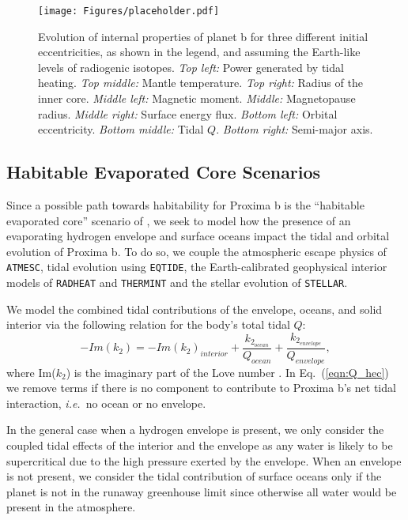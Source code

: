 \documentclass[preprint,12pt]{aastex}
\def\ie{{\it i.e.\ }}
\def\atmesc{\texttt{\footnotesize{ATMESC}}\xspace}
\def\eqtide{\texttt{\footnotesize{EQTIDE}}\xspace}
\def\radheat{\texttt{\footnotesize{RADHEAT}}\xspace}
\def\thermint{\texttt{\footnotesize{THERMINT}}\xspace}
\def\stellar{\texttt{\footnotesize{STELLAR}}\xspace}
\begin{document}
\begin{figure}[ht]
\begin{center}
\texttt{[image: Figures/placeholder.pdf]}
\end{center}
\caption{Evolution of internal properties of planet b for three
  different initial eccentricities, as shown in the legend, and
  assuming the Earth-like levels of radiogenic isotopes. {\it Top
    left:} Power generated by tidal heating. {\it Top middle:} Mantle
  temperature. {\it Top right:} Radius of the inner core. {\it Middle
    left:} Magnetic moment. {\it Middle:} Magnetopause radius. {\it
    Middle right:} Surface energy flux. {\it Bottom left:} Orbital
  eccentricity. {\it Bottom middle:} Tidal $Q$. {\it Bottom right:}
  Semi-major axis.}
\label{fig:tides}
\end{figure}

\subsection{Habitable Evaporated Core Scenarios}

Since a possible path towards habitability for Proxima b is the
``habitable evaporated core'' scenario of \citet{Luger15}, we seek to
model how the presence of an evaporating hydrogen envelope and surface
oceans impact the tidal and orbital evolution of Proxima b.  To do so,
we couple the atmospheric escape physics of \atmesc, tidal evolution
using \eqtide, the Earth-calibrated geophysical interior models of
\radheat and \thermint and the stellar evolution of \stellar.

We model the combined tidal contributions of the envelope, oceans, and
solid interior via the following relation for the body's total tidal
$Q$:
\begin{equation}
\label{eqn:Q_hec}
-Im(k_2) = -Im(k_2)_{interior} + \frac{ k_{2_{ocean}}}{Q_{ocean}} +  %
\frac{ k_{2_{envelope}}}{Q_{envelope}},
\end{equation}
where Im($k_2$) is the imaginary part of the Love number \citep[see][]{DriscollBarnes15}. In Eq.~(\ref{eqn:Q_hec}) we remove terms if there is no 
component to contribute to Proxima b's net tidal interaction, \ie no ocean or no envelope.  

In the general case when a hydrogen envelope is present, we only
consider the coupled tidal effects of the interior and the envelope as any
water is likely to be supercritical due to the high pressure exerted
by the envelope.  When an envelope is not present,
we consider the tidal contribution of surface oceans only if the planet is
not in the runaway greenhouse limit since otherwise all water would be present
in the atmosphere.
\end{document}
